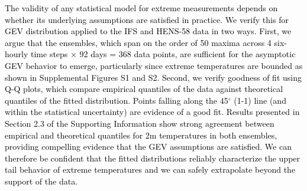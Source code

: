 \documentclass[draft]{agujournal2019}
\newcommand{\newTxt}{\textcolor{black}}
\begin{document}
\newTxt{
The validity of any statistical model for extreme measurements depends on whether its underlying assumptions are satisfied in practice. We verify this for GEV distribution applied to the IFS and HENS-58 data in two ways. First, we argue that the ensembles, which span on the order of 50 maxima across 4 six-hourly time steps $\times$ 92 days = 368 data points, are sufficient for the asymptotic GEV behavior to emerge, particularly since extreme temperatures are bounded \citep{dombry2019maximum} as shown in Supplemental Figures S1 and S2. Second, we verify goodness of fit using Q-Q plots, which compare empirical quantiles of the data against theoretical quantiles of the fitted distribution.
Points falling along the 45$^\circ$ (1-1) line (and within the statistical uncertainty) are evidence of a good fit.
Results presented in Section 2.3 of the Supporting Information show strong agreement between empirical and theoretical quantiles for 2m temperatures in both ensembles, providing compelling evidence that the GEV assumptions are satisfied. We can therefore be confident that the fitted distributions reliably characterize the upper tail behavior of extreme temperatures and we can safely extrapolate beyond the support of the data.}

\end{document}

